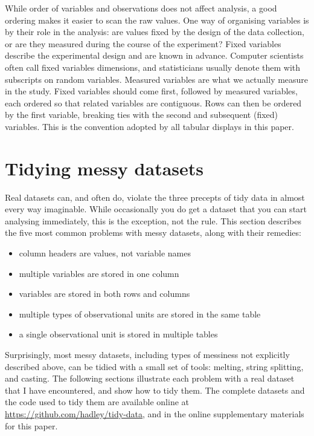\documentclass[article]{jss}
\begin{document}
While order of variables and observations does not affect analysis, a good ordering makes it easier to scan the raw values. One way of organising variables is by their role in the analysis: are values fixed by the design of the data collection, or are they measured during the course of the experiment? Fixed variables describe the experimental design and are known in advance. Computer scientists often call fixed variables dimensions, and statisticians usually denote them with subscripts on random variables. Measured variables are what we actually measure in the study. Fixed variables should come first, followed by measured variables, each ordered so that related variables are contiguous. Rows can then be ordered by the first variable, breaking ties with the second and subsequent (fixed) variables. This is the convention adopted by all tabular displays in this paper. 

\section{Tidying messy datasets}
\label{sec:tidying}

Real datasets can, and often do, violate the three precepts of tidy data in almost every way imaginable. While occasionally you do get a dataset that you can start analysing immediately, this is the exception, not the rule. This section describes the five most common problems with messy datasets, along with their remedies:

\begin{itemize}
  \item column headers are values, not variable names
  \item multiple variables are stored in one column
  \item variables are stored in both rows and columns
  \item multiple types of observational units are stored in the same table
  \item a single observational unit is stored in multiple tables
\end{itemize}

Surprisingly, most messy datasets, including types of messiness not explicitly described above, can be tidied with a small set of tools: melting, string splitting, and casting. The following sections illustrate each problem with a real dataset that I have encountered, and show how to tidy them. The complete datasets and the  code used to tidy them are available online at \url{https://github.com/hadley/tidy-data}, and in the online supplementary materials for this paper.
\end{document}
